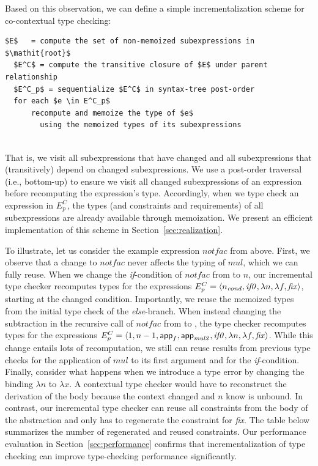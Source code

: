 \documentclass{llncs}
\begin{document}
Based on this observation, we can define a simple incrementalization
scheme for co-contextual type checking:
%
\\[1ex]
\newsavebox{\codebox}
\begin{lrbox}{\codebox}
\begin{lstlisting}[mathescape=true]
  $E$   = compute the set of non-memoized subexpressions in $\mathit{root}$
  $E^C$ = compute the transitive closure of $E$ under parent relationship
  $E^C_p$ = sequentialize $E^C$ in syntax-tree post-order
  for each $e \in E^C_p$
      recompute and memoize the type of $e$
        using the memoized types of its subexpressions
\end{lstlisting}
\end{lrbox}
\indent\fboxgray{\usebox\codebox} 	
\\[1ex]
%
That is, we visit all subexpressions that have changed and all subexpressions
that (transitively) depend on changed subexpressions. We use a post-order 
traversal (i.e., bottom-up) to ensure we visit all changed subexpressions of an expression before
recomputing the expression's type. Accordingly, when we type check an expression
in $E^C_p$, the types (and constraints and requirements) of all subexpressions
are already available through memoization. We present an efficient
implementation of this scheme in Section~\ref{sec:realization}.

To illustrate, let us consider the example expression $\mathit{notfac}$ from
above. First, we observe that a change to $\mathit{notfac}$ never affects the
typing of $\mathit{mul}$, which we can fully reuse. When we change the
\emph{if}-condition of $\mathit{notfac}$ from  to $n$, our incremental
type checker recomputes types for the expressions
%
$E^C_p = \langle n_{\mathit{cond}}, \mathit{if0}, \lambda n, \lambda f, \mathit{fix} \rangle$,
%
starting at the changed condition. Importantly, we reuse the memoized types from
the initial type check of the \emph{else}-branch. When instead changing the
subtraction in the recursive call of $\mathit{notfac}$ from  to
, the type checker recomputes types for the expressions
%
$E^C_p = \langle 1, n-1, \textsf{app}_f, \textsf{app}_{\mathit{mul2}}, \mathit{if0}, \lambda n, \lambda f, \mathit{fix} \rangle$.
%
While this change entails lots of recomputation, we still can reuse results from
previous type checks for the application of $\mathit{mul}$ to its first argument
and for the \emph{if}-condition. Finally, consider what happens when we
introduce a type error by changing the binding $\lambda n$ to $\lambda x$. A
contextual type checker would have to reconstruct the derivation of the body
because the context changed and $n$ know is unbound. In contrast, our
incremental type checker can reuse all constraints from the body of the
abstraction and only has to regenerate the constraint for \emph{fix}. The table
below summarizes the number of regenerated and reused constraints. Our
performance evaluation in Section~\ref{sec:performance} confirms that
incrementalization of type checking can improve type-checking performance
significantly.
\end{document}
